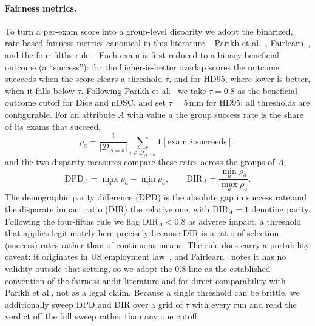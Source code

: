 \paragraph{Fairness metrics.}
To turn a per-exam score into a group-level disparity we adopt the binarized,
rate-based fairness metrics canonical in this literature -- Parikh
et al.~\cite{parikh2025labelbias,parikh2025whofails}, Fairlearn~\cite{bird2020fairlearn},
and the four-fifths rule~\cite{eeoc1978uniform}. Each exam is first reduced to a
binary beneficial outcome (a ``success''): for the higher-is-better overlap
scores the outcome succeeds when the score clears a threshold $\tau$, and for
HD95, where lower is better, when it falls below $\tau$. Following Parikh
et al.~\cite{parikh2025labelbias,parikh2025whofails} we take $\tau = 0.8$ as the
beneficial-outcome cutoff for Dice and nDSC, and set $\tau = 5$\,mm for HD95; all
thresholds are configurable. For an attribute $A$ with value $a$ the group success rate is the
share of its exams that succeed,
\begin{equation}
  \rho_a = \frac{1}{|\mathcal{D}_{A=a}|}
           \sum_{i \in \mathcal{D}_{A=a}} \mathbf{1}[\text{exam $i$ succeeds}],
  \label{eq:rate}
\end{equation}
and the two disparity measures compare these rates across the groups of $A$,
\begin{equation}
  \mathrm{DPD}_A = \max_a \rho_a - \min_a \rho_a,
  \qquad
  \mathrm{DIR}_A = \dfrac{\min_a \rho_a}{\max_a \rho_a}.
  \label{eq:dpddir}
\end{equation}
The demographic parity difference (DPD) is the absolute gap in success rate and
the disparate impact ratio (DIR) the relative one, with $\mathrm{DIR}_A = 1$
denoting parity. Following the four-fifths rule we flag $\mathrm{DIR}_A < 0.8$ as
adverse impact, a threshold that applies legitimately here precisely because DIR
is a ratio of selection (success) rates rather than of continuous means. The rule
does carry a portability caveat: it originates in US employment
law~\cite{eeoc1978uniform}, and Fairlearn~\cite{bird2020fairlearn} notes it has no
validity outside that setting, so we adopt the $0.8$ line as the established
convention of the fairness-audit literature and for direct comparability with
Parikh et al., not as a legal claim. Because a single threshold can be brittle, we
additionally sweep DPD and DIR over a grid of $\tau$ with every run and
read the verdict off the full sweep rather than any one cutoff.

